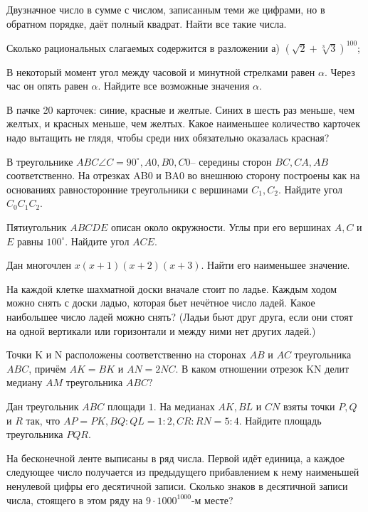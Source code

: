 \hspace{3mm}

Двузначное число в сумме с числом, записанным теми же цифрами, но в обратном порядке, даёт полный квадрат. Найти все такие числа.


Сколько рациональных слагаемых содержится в разложении
а) $(\sqrt{2} + \sqrt[3]{3})^{100}$;


В некоторый момент угол между часовой и минутной стрелками равен $\alpha$. Через час он опять равен $\alpha$. Найдите все возможные значения $\alpha$.


В пачке 20 карточек: синие, красные и желтые. Синих в шесть раз меньше, чем желтых, и красных меньше, чем желтых. Какое наименьшее количество карточек надо вытащить не глядя, чтобы среди них обязательно оказалась красная?


В треугольнике $ABC \angle C = 90^{\circ}, A0, B0, C0 –$ середины сторон $BC, CA, AB$ соответственно. На отрезках AB0 и BA0 во внешнюю сторону построены как на основаниях равносторонние треугольники с вершинами $C_1, C_2$. Найдите угол $C_0C_1C_2$.

Пятиугольник $ABCDE$ описан около окружности. Углы при его вершинах $A, C$ и $E$ равны $100^{\circ}$. Найдите угол $ACE$.

Дан многочлен  $x(x + 1)(x + 2)(x + 3)$.  Найти его наименьшее значение.

На каждой клетке шахматной доски вначале стоит по ладье. Каждым ходом можно снять с доски ладью, которая бьет нечётное число ладей. Какое наибольшее число ладей можно снять? (Ладьи бьют друг друга, если они стоят на одной вертикали или горизонтали и между ними нет других ладей.)

Точки K и N расположены соответственно на сторонах $AB$ и $AC$ треугольника $ABC$, причём  $AK = BK$  и  $AN = 2NC$. В каком отношении отрезок KN делит медиану $AM$ треугольника $ABC?$

Дан треугольник $ABC$ площади $1$. На медианах $AK, BL$ и $CN$ взяты точки $P, Q$ и $R$ так, что  $AP = PK,  BQ : QL = 1 : 2,  CR : RN = 5 : 4$.  Найдите площадь треугольника $PQR$.

На бесконечной ленте выписаны в ряд числа. Первой идёт единица, а каждое следующее число получается из предыдущего прибавлением к нему наименьшей ненулевой цифры его десятичной записи. Сколько знаков в десятичной записи числа, стоящего в этом ряду на $9\cdot1000^{1000}$-м месте?